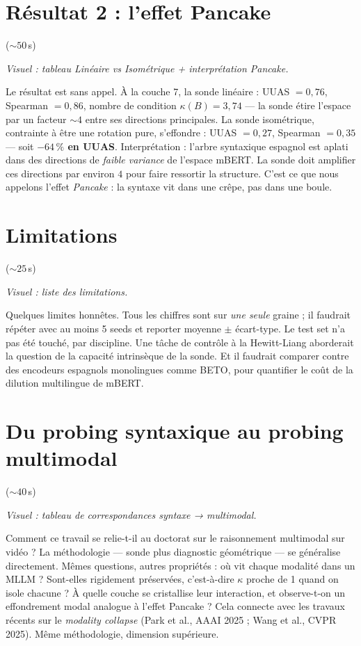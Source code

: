 \documentclass[11pt]{article}
\newcommand{\visuel}[1]{%
  {\footnotesize\color{midgray}\textit{Visuel : #1}\par\vspace{0.3em}}}
\newcommand{\duree}[1]{\hfill{\footnotesize\color{midgray}(${\sim}#1$\,s)}}
\newcommand{\mbert}{m\textsc{BERT}\xspace}
\begin{document}
\section{Résultat 2 : l'effet Pancake} \duree{50}
\visuel{tableau Linéaire vs Isométrique + interprétation Pancake.}

Le résultat est sans appel. À la couche 7, la sonde linéaire :
UUAS $= 0{,}76$, Spearman $= 0{,}86$, nombre de condition
$\kappa(B) = 3{,}74$ --- la sonde étire l'espace par un facteur
${\sim}4$ entre ses directions principales. La sonde isométrique,
contrainte à être une rotation pure, s'effondre :
UUAS $= 0{,}27$, Spearman $= 0{,}35$ --- soit \textbf{$-64\,\%$ en UUAS}. Interprétation : l'arbre syntaxique espagnol est aplati dans
des directions de \emph{faible variance} de l'espace \mbert{}. La
sonde doit amplifier ces directions par environ $4$ pour faire
ressortir la structure. C'est ce que nous appelons l'effet
\emph{Pancake} : la syntaxe vit dans une crêpe, pas dans une boule.

\section{Limitations} \duree{25}
\visuel{liste des limitations.}

Quelques limites honnêtes. Tous les chiffres sont sur \emph{une
seule} graine ; il faudrait répéter avec au moins 5 seeds et reporter
moyenne $\pm$ écart-type. Le test set n'a pas été touché, par
discipline. Une tâche de contrôle à la Hewitt-Liang aborderait la
question de la capacité intrinsèque de la sonde. Et il faudrait
comparer contre des encodeurs espagnols monolingues comme BETO,
pour quantifier le coût de la dilution multilingue de \mbert{}.

\section{Du probing syntaxique au probing multimodal} \duree{40}
\visuel{tableau de correspondances syntaxe → multimodal.}

Comment ce travail se relie-t-il au doctorat sur le raisonnement
multimodal sur vidéo ? La méthodologie --- sonde plus diagnostic
géométrique --- se généralise directement. Mêmes questions, autres
propriétés : où vit chaque modalité dans un MLLM ? Sont-elles
rigidement préservées, c'est-à-dire $\kappa$ proche de 1 quand on
isole chacune ? À quelle couche se cristallise leur interaction,
et observe-t-on un effondrement modal analogue à l'effet Pancake ?
Cela connecte avec les travaux récents sur le \emph{modality
collapse} (Park et al., AAAI 2025 ; Wang et al., CVPR 2025). Même
méthodologie, dimension supérieure.
\end{document}
